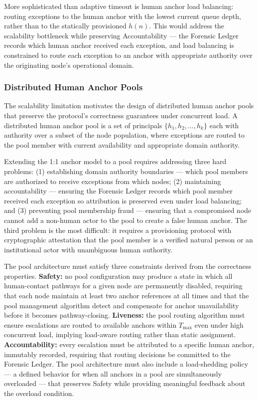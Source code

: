 More sophisticated than adaptive timeout is human anchor load balancing: routing exceptions to the human anchor with the lowest current queue depth, rather than to the statically provisioned $h(n)$. This would address the scalability bottleneck while preserving Accountability --- the Forensic Ledger records which human anchor received each exception, and load balancing is constrained to route each exception to an anchor with appropriate authority over the originating node's operational domain.

\subsubsection{Distributed Human Anchor Pools}
\label{sec:distributed-anchor-pools}

The scalability limitation motivates the design of distributed human anchor pools that preserve the protocol's correctness guarantees under concurrent load. A distributed human anchor pool is a set of principals $\{h_1, h_2, \ldots, h_k\}$ each with authority over a subset of the node population, where exceptions are routed to the pool member with current availability and appropriate domain authority.

Extending the 1:1 anchor model to a pool requires addressing three hard problems: (1) establishing domain authority boundaries --- which pool members are authorized to receive exceptions from which nodes; (2) maintaining accountability --- ensuring the Forensic Ledger records which pool member received each exception so attribution is preserved even under load balancing; and (3) preventing pool membership fraud --- ensuring that a compromised node cannot add a non-human actor to the pool to create a false human anchor. The third problem is the most difficult: it requires a provisioning protocol with cryptographic attestation that the pool member is a verified natural person or an institutional actor with unambiguous human authority.

The pool architecture must satisfy three constraints derived from the correctness properties. \textbf{Safety:} no pool configuration may produce a state in which all human-contact pathways for a given node are permanently disabled, requiring that each node maintain at least two anchor references at all times and that the pool management algorithm detect and compensate for anchor unavailability before it becomes pathway-closing. \textbf{Liveness:} the pool routing algorithm must ensure escalations are routed to available anchors within $T_{\max}$ even under high concurrent load, implying load-aware routing rather than static assignment. \textbf{Accountability:} every escalation must be attributed to a specific human anchor, immutably recorded, requiring that routing decisions be committed to the Forensic Ledger. The pool architecture must also include a load-shedding policy --- a defined behavior for when all anchors in a pool are simultaneously overloaded --- that preserves Safety while providing meaningful feedback about the overload condition.

